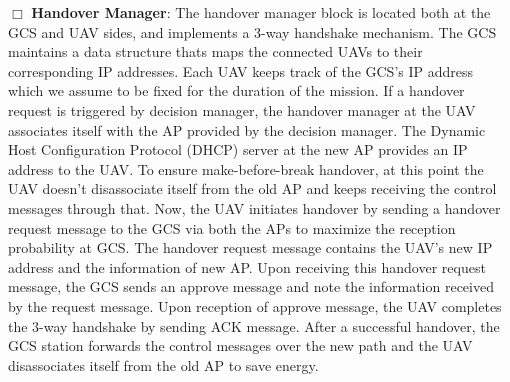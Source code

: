 \noindent
$\Box$ {\bf{Handover Manager}}: 
The handover manager block is located both at the GCS and UAV sides, and implements a 3-way handshake mechanism. The GCS maintains a data structure thats maps the connected UAVs to their corresponding IP addresses. Each UAV keeps track of the GCS's IP address which we assume to be fixed for the duration of the mission. If a handover request is triggered by decision manager, the handover manager at the UAV associates itself with the AP provided by the decision manager. The Dynamic Host Configuration Protocol (DHCP) server at the new AP provides an IP address to the UAV. To ensure make-before-break handover, at this point the UAV doesn't disassociate itself from the old AP and keeps receiving the control messages through that. Now, the UAV initiates handover by sending a handover request message to the GCS via both the APs to maximize the reception probability at GCS. The handover request message contains the UAV's new IP address and the information of new AP. Upon receiving this handover request message, the GCS sends an approve message and note the information received by the request message. Upon reception of approve message, the UAV completes the 3-way handshake by sending ACK message. After a successful handover, the GCS station forwards the control messages over the new path and the UAV disassociates itself from the old AP to save energy.

